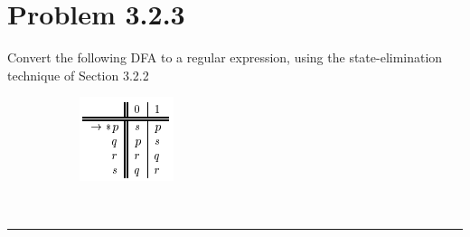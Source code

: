 \documentclass[20pt]{article} %
\begin{document}
\section{Problem 3.2.3}
Convert the following DFA to a regular expression, using the state-elimination technique of Section 3.2.2 
\begin{figure}[!htbp]
  	\centering
   	\begin{subfigure}[p]{0.2\linewidth}
    	\includegraphics[width=\linewidth]{./figures/HW4fig2.png}
   	\end{subfigure}
\end{figure} \\
\noindent\rule{2cm}{0.4pt} \\
\end{document}
